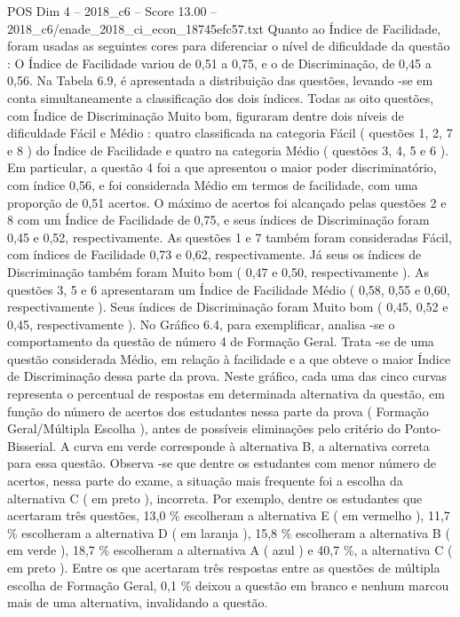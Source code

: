 \begin{textsample}{POS Dim 4 – 2018\_c6 – Score 13.00 – 2018\_c6/enade\_2018\_ci\_econ\_18745efc57.txt}
Quanto ao Índice de Facilidade, foram usadas as seguintes cores para diferenciar o nível de dificuldade da questão : O Índice de Facilidade variou de 0,51 a 0,75, e o de Discriminação, de 0,45 a 0,56.
Na Tabela 6.9, é apresentada a distribuição das questões, levando -se em conta simultaneamente a classificação dos dois índices.
Todas as oito questões, com Índice de Discriminação Muito bom, figuraram dentre dois níveis de dificuldade Fácil e Médio : quatro classificada na categoria Fácil ( questões 1, 2, 7 e 8 ) do Índice de Facilidade e quatro na categoria Médio ( questões 3, 4, 5 e 6 ).
Em particular, a questão 4 foi a que apresentou o maior poder discriminatório, com índice 0,56, e foi considerada Médio em termos de facilidade, com uma proporção de 0,51 acertos.
O máximo de acertos foi alcançado pelas questões 2 e 8 com um Índice de Facilidade de 0,75, e seus índices de Discriminação foram 0,45 e 0,52, respectivamente.
As questões 1 e 7 também foram consideradas Fácil, com índices de Facilidade 0,73 e 0,62, respectivamente.
Já seus os índices de Discriminação também foram Muito bom ( 0,47 e 0,50, respectivamente ).
As questões 3, 5 e 6 apresentaram um Índice de Facilidade Médio ( 0,58, 0,55 e 0,60, respectivamente ).
Seus índices de Discriminação foram Muito bom ( 0,45, 0,52 e 0,45, respectivamente ).
No Gráfico 6.4, para exemplificar, analisa -se o comportamento da questão de número 4 de Formação Geral.
Trata -se de uma questão considerada Médio, em relação à facilidade e a que obteve o maior Índice de Discriminação dessa parte da prova.
Neste gráfico, cada uma das cinco curvas representa o percentual de respostas em determinada alternativa da questão, em função do número de acertos dos estudantes nessa parte da prova ( Formação Geral/Múltipla Escolha ), antes de possíveis eliminações pelo critério do Ponto-Bisserial.
A curva em verde corresponde à alternativa B, a alternativa correta para essa questão.
Observa -se que dentre os estudantes com menor número de acertos, nessa parte do exame, a situação mais frequente foi a escolha da alternativa C ( em preto ), incorreta.
Por exemplo, dentre os estudantes que acertaram três questões, 13,0 \% escolheram a alternativa E ( em vermelho ), 11,7 \% escolheram a alternativa D ( em laranja ), 15,8 \% escolheram a alternativa B ( em verde ), 18,7 \% escolheram a alternativa A ( azul ) e 40,7 \%, a alternativa C ( em preto ).
Entre os que acertaram três respostas entre as questões de múltipla escolha de Formação Geral, 0,1 \% deixou a questão em branco e nenhum marcou mais de uma alternativa, invalidando a questão.

\end{textsample}
